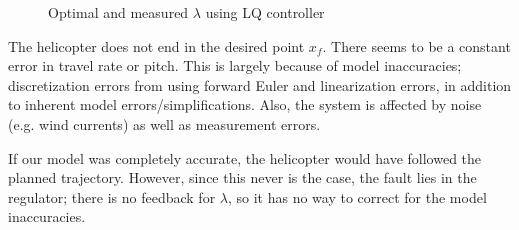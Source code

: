 \begin{figure}[H]
    \centering
    \caption{Optimal and measured $\lambda$ using LQ controller}
    \label{fig:my_label}
\end{figure}

The helicopter does not end in the desired point $x_f$. There seems to be a constant error in travel rate or pitch. This is largely  because of model inaccuracies; discretization errors from using forward Euler and linearization errors, in addition to inherent model errors/simplifications. Also, the system is affected by noise (e.g. wind currents) as well as measurement errors.

If our model was completely accurate, the helicopter would have followed the planned trajectory. However, since this never is the case, the fault lies in the regulator; there is no feedback for $\lambda$, so it has no way to correct for the model inaccuracies. 

